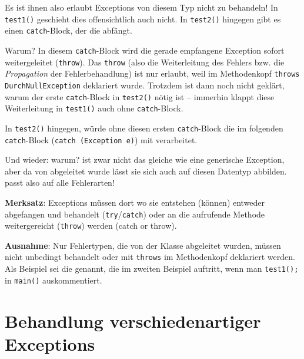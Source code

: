 Es ist ihnen also erlaubt Exceptions von diesem Typ nicht zu behandeln! In
\lstinline|test1()| geschieht dies offensichtlich auch nicht. In
\lstinline|test2()| hingegen gibt es einen \lstinline|catch|-Block, der die
 abfängt.

Warum? In diesem \lstinline|catch|-Block wird die gerade empfangene Exception
sofort weitergeleitet (\lstinline|throw|). Das \lstinline|throw| (also die
Weiterleitung des Fehlers bzw. die {\em Propagation} der Fehlerbehandlung)
ist nur erlaubt, weil im Methodenkopf \lstinline|throws DurchNullException|
deklariert wurde. Trotzdem ist dann noch nicht geklärt, warum der erste
\lstinline|catch|-Block in \lstinline|test2()| nötig ist -- immerhin klappt
diese Weiterleitung in \lstinline|test1()| auch ohne \lstinline|catch|-Block.

In \lstinline|test2()| hingegen, würde ohne diesen ersten
\lstinline|catch|-Block die  im folgenden
\lstinline|catch|-Block (\lstinline|catch (Exception e)|) mit \glqq
verarbeitet\grqq .

Und wieder: warum?  ist zwar nicht das gleiche wie
eine generische Exception, aber da  von
 abgeleitet wurde lässt sie sich auch auf diesen Datentyp
abbilden.  passt also auf alle Fehlerarten!

\textbf{Merksatz}: Exceptions müssen dort wo sie entstehen (können) entweder
abgefangen und behandelt (\lstinline|try|/\lstinline|catch|) oder an die
aufrufende Methode weitergereicht (\lstinline|throw|) werden (\glqq catch or
throw\grqq ).

\textbf{Ausnahme}: Nur Fehlertypen, die von der Klasse
 abgeleitet wurden, müssen nicht unbedingt behandelt
oder mit \lstinline|throws| im Methodenkopf deklariert werden. Als Beispiel sei
die  genannt,  die im zweiten Beispiel auftritt,
wenn man \lstinline|test1();| in \lstinline|main()| auskommentiert.


\section{Behandlung verschiedenartiger Exceptions}


